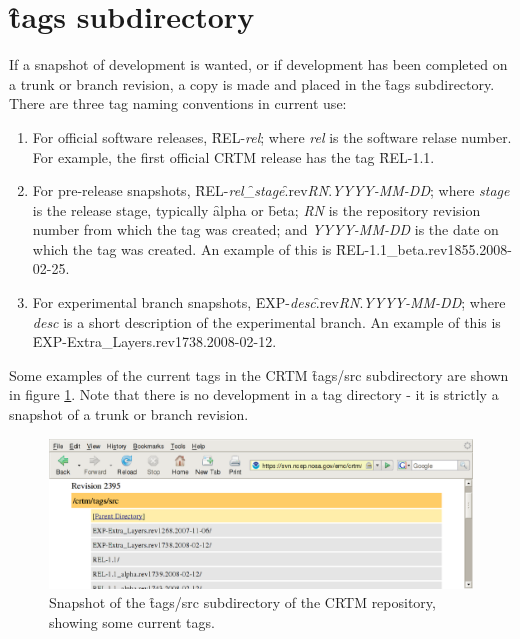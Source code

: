 \section{\f{tags} subdirectory}
If a snapshot of development is wanted, or if development has been completed on a trunk or branch revision, a copy is made and placed in the \f{tags} subdirectory. There are three tag naming conventions in current use:
\begin{enumerate}
  \item For official software releases, \f{REL-}\textit{rel}; where \textit{rel} is the software relase number. For example, the first official CRTM release has the tag \f{REL-1.1}.
  \item For pre-release snapshots, \f{REL-}\textit{rel}\f{\_}\textit{stage}\f{.rev}\textit{RN}\f{.}\textit{YYYY-MM-DD}; where \textit{stage} is the release stage, typically \f{alpha} or \f{beta}; \textit{RN} is the repository revision number from which the tag was created; and \textit{YYYY-MM-DD} is the date on which the tag was created. An example of this is \f{REL-1.1\_beta.rev1855.2008-02-25}.
  \item For experimental branch snapshots, \f{EXP-}\textit{desc}\f{.rev}\textit{RN}\f{.}\textit{YYYY-MM-DD}; where \textit{desc} is a short description of the experimental branch. An example of this is \f{EXP-Extra\_Layers.rev1738.2008-02-12}.
\end{enumerate}
Some examples of the current tags in the CRTM \f{tags/src} subdirectory are shown in figure \ref{fig:tags_src_repository}. Note that there is no development in a tag directory - it is strictly a snapshot of a trunk or branch revision.

\begin{figure}[htb]
  \centering
  \includegraphics[scale=0.5]{graphics/tags_src_repository.eps}
  \caption{Snapshot of the \f{tags/src} subdirectory of the CRTM repository, showing some current tags.}
  \label{fig:tags_src_repository}
\end{figure}

